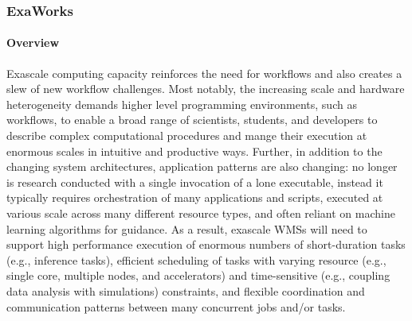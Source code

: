 \subsubsection{ ExaWorks} \label{subsubsect:exaworks}


\paragraph{Overview} Exascale computing capacity reinforces the need for workflows and also creates
a slew of new workflow challenges. Most notably, the increasing scale and
hardware heterogeneity demands higher level programming environments,
such as workflows, to enable a broad range of scientists, students, and
developers to describe complex computational procedures and mange their
execution at enormous scales in intuitive and productive ways. Further, in
addition to the changing system architectures, application patterns are also
changing: no longer is research conducted with a single invocation of a 
lone executable, instead it typically requires orchestration of many 
applications and scripts, executed at various scale across many different
resource types, and often reliant on machine learning algorithms for guidance.
As a result, exascale WMSs will need to support high performance execution of
enormous numbers of short-duration tasks (e.g., inference tasks), efficient
scheduling of tasks with varying resource (e.g., single core, multiple nodes,
and accelerators) and time-sensitive (e.g., coupling data analysis with
simulations) constraints, and flexible coordination and communication patterns between
many concurrent jobs and/or tasks.



